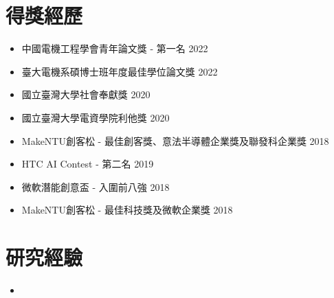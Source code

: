 \documentclass{resume}
\begin{document}
\section{得獎經歷}
\begin{itemize}
    \item 中國電機工程學會青年論文獎 - 第一名 \hspace{\fill} \small{2022}
    \item 臺大電機系碩博士班年度最佳學位論文獎 \hspace{\fill} \small{2022}
    \item 國立臺灣大學社會奉獻獎 \hspace{\fill} \small{2020}
    \item 國立臺灣大學電資學院利他獎 \hspace{\fill} \small{2020}
    \item MakeNTU創客松 - 最佳創客獎、意法半導體企業獎及聯發科企業獎 \hspace{\fill} \small{2018}
    \item HTC AI Contest - 第二名 \hspace{\fill} \small{2019}
    \item 微軟潛能創意盃 - 入圍前八強 \hspace{\fill} \small{2018}
    \item MakeNTU創客松 - 最佳科技獎及微軟企業獎 \hspace{\fill} \small{2018}
\end{itemize}


\section{研究經驗}
\begin{itemize}
    \item 
\end{itemize}
\end{document}
